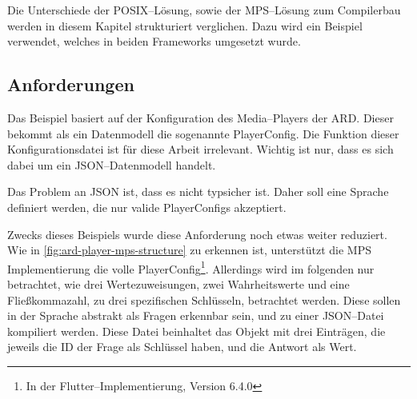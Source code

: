 Die Unterschiede der \acs{POSIX}--Lösung, sowie der \acs{MPS}--Lösung zum Compilerbau werden in diesem Kapitel strukturiert verglichen.
Dazu wird ein Beispiel verwendet, welches in beiden Frameworks umgesetzt wurde.

\subsection{Anforderungen}\label{subsec:anforderungen-ardplayer}
Das Beispiel basiert auf der Konfiguration des Media--Players der \ac{ARD}.
Dieser bekommt als ein Datenmodell die sogenannte {\ttfamily PlayerConfig}.
Die Funktion dieser Konfigurationsdatei ist für diese Arbeit irrelevant.
Wichtig ist nur, dass es sich dabei um ein \acs{JSON}--Datenmodell handelt.

Das Problem an \ac{JSON} ist, dass es nicht typsicher ist.
Daher soll eine Sprache definiert werden, die nur valide {\ttfamily PlayerConfig}s akzeptiert.

Zwecks dieses Beispiels wurde diese Anforderung noch etwas weiter reduziert.
Wie in \autoref{fig:ard-player-mps-structure} zu erkennen ist, unterstützt die \ac{MPS} Implementierung die volle {\ttfamily PlayerConfig}\footnote{In der Flutter--Implementierung, Version 6.4.0}.
Allerdings wird im folgenden nur betrachtet, wie drei Wertezuweisungen, zwei Wahrheitswerte und eine Fließkommazahl, zu drei spezifischen Schlüsseln, betrachtet werden.
Diese sollen in der Sprache abstrakt als Fragen erkennbar sein, und zu einer \ac{JSON}--Datei kompiliert werden.
Diese Datei beinhaltet das Objekt mit drei Einträgen, die jeweils die \ac{ID} der Frage als Schlüssel haben, und die Antwort als Wert.

